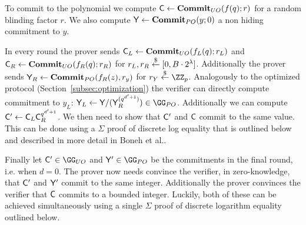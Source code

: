 To commit to the polynomial we compute $\mathsf{C}\gets \textbf{{Commit}}_{UO}(f(q);r)$ for a random blinding factor $r$. 
We also compute $\mathsf{Y}\gets \textbf{{Commit}}_{PO}(y;0)$ a non hiding commitment to $y$.

In every round the prover sends $\mathsf{C}_L\gets\textbf{{Commit}}_{UO}(f_L(q);r_L)$ and $\mathsf{C}_R\gets\textbf{{Commit}}_{UO}(f_R(q);r_R)$ for $r_L,r_R \overset{\$}{\gets} [0,B\cdot 2^{\lambda}]$. Additionally the prover sends $\mathsf{Y}_R\gets\textbf{{Commit}}_{PO}(f_R(z),r_y)$ for $r_Y\sample \ZZ_p$. 
Analogously to the optimized protocol (Section~\ref{subsec:optimization}) the verifier can directly compute commitment to $y_L$: $\gr{Y}_L\gets\gr{Y}/(\gr{Y}_R^{(q^{d'+1})})\in \GG_{PO}$. Additionally we can compute $\mathsf{C}'\gets \mathsf{C}_L\mathsf{C}_R^{q^{d'+1}}$. We then need to show that $\mathsf{C}'$ and $\mathsf{C}$ commit to the same value. This can be done using a $\Sigma$ proof of discrete log equality that is outlined below and described in more detail in Boneh et al.\cite{C:BonBunFis19}.
 
Finally let $\gr{C}'\in \GG_{UO}$ and $\gr{Y}'\in \GG_{PO}$ be the commitments in the final round, i.e. when $d=0$. The prover now needs convince the verifier, in zero-knowledge, that $\mathsf{C}'$ and $\mathsf{Y}'$ commit to the same integer. Additionally the prover convinces the verifier that $\mathsf{C}$ commits to a bounded integer. Luckily, both of these can be achieved simultaneously using a single $\Sigma$ proof of discrete logarithm equality outlined below.

